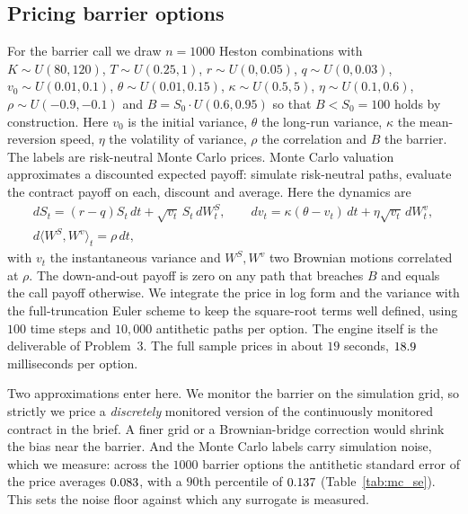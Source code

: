 \documentclass[12pt,a4paper]{article}
\begin{document}
\subsection{Pricing barrier options}
For the barrier call we draw $n=1000$ Heston combinations with
$K\sim U(80,120)$, $T\sim U(0.25,1)$, $r\sim U(0,0.05)$, $q\sim U(0,0.03)$,
$v_0\sim U(0.01,0.1)$, $\theta\sim U(0.01,0.15)$, $\kappa\sim U(0.5,5)$,
$\eta\sim U(0.1,0.6)$, $\rho\sim U(-0.9,-0.1)$ and $B=S_0\cdot U(0.6,0.95)$ so
that $B<S_0=100$ holds by construction. Here $v_0$ is the initial variance,
$\theta$ the long-run variance, $\kappa$ the mean-reversion speed, $\eta$ the
volatility of variance, $\rho$ the correlation and $B$ the barrier. The labels
are risk-neutral Monte Carlo
prices. Monte Carlo valuation approximates a discounted
expected payoff: simulate risk-neutral paths, evaluate the contract payoff on
each, discount and average. Here the dynamics are
\begin{gather*}
dS_t = (r-q)S_t\,dt + \sqrt{v_t}\,S_t\,dW^S_t,
\qquad
dv_t = \kappa(\theta-v_t)\,dt + \eta\sqrt{v_t}\,dW^v_t, \\
d\langle W^S,W^v\rangle_t = \rho\,dt,
\end{gather*}
with $v_t$ the instantaneous variance and $W^S,W^v$ two Brownian motions
correlated at $\rho$. The down-and-out payoff is zero on any path that breaches
$B$ and equals the call payoff otherwise. We integrate the price in log form and the variance with the
full-truncation Euler scheme to keep the
square-root terms well defined, using $100$ time steps and $10{,}000$
antithetic paths per option. The engine itself is the deliverable of
Problem~3. The full sample prices in about $19$ seconds, $18.9$ milliseconds
per option.

Two approximations enter here. We monitor the barrier on the simulation
grid, so strictly we price a \emph{discretely} monitored version of the
continuously monitored contract in the brief. A finer grid or a Brownian-bridge
correction would shrink the bias near the barrier. And the Monte Carlo labels
carry simulation noise, which we measure: across the $1000$ barrier options the
antithetic standard error of the price averages $0.083$, with a $90$th
percentile of $0.137$ (Table~\ref{tab:mc_se}). This sets the noise floor
against which any surrogate is measured.
\end{document}
